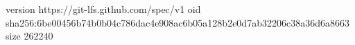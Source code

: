 version https://git-lfs.github.com/spec/v1
oid sha256:6be00456b74b0b04c786dac4e908ac6b05a128b2e0d7ab32206c38a36d6a8663
size 262240
